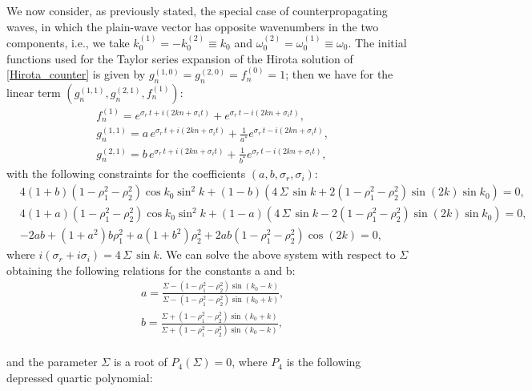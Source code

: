 \documentclass{article}
\begin{document}
We now consider, as previously stated, the special case  of counterpropagating waves, in which the plain-wave vector has opposite wavenumbers in the two components, i.e., we take $k_0^{(1)}=-k_0^{(2)}\equiv k_0$ and $\omega_0^{(2)}=\omega_0^{(1)}\equiv\omega_0$. The initial functions used for the Taylor series expansion of the Hirota solution of \eqref{Hirota_counter} is given by $g^{(1,0)}_n=g^{(2,0)}_n=f^{(0)}_n=1$; then we have for the linear term $(g_n^{(1,1)},g_n^{(2,1)},f^{(1)}_n):$
\begin{equation}
    \begin{split}
       & f^{(1)}_n=e^{\sigma_r\,t+i(2  k n+\sigma_i t)}+e^{\sigma_r\,t-i(2  k n+\sigma_i t)},\\
        & g_n^{(1,1)}=a\,e^{\sigma_r\,t+i(2  k n+\sigma_i t)}+\frac{1}{a^*}e^{\sigma_r\,t-i(2  k n+\sigma_i t)},\\
         & g_n^{(2,1)}=b\,e^{\sigma_r\,t+i(2  k n+\sigma_i t)}+\frac{1}{b^*}e^{\sigma_r\,t-i(2  k n+\sigma_i t)},
    \end{split}
\end{equation}
with the following constraints for the coefficients $(a,b,\sigma_r,\sigma_i)$:
\begin{equation}
\begin{split}
&4(1+b)(1-\rho_1^2-\rho_2^2)\cos k_0\sin^2k+(1-b)(4 \,\Sigma\, \sin k +2(1-\rho_1^2-\rho_2^2)\sin(2 k)\sin k_0)=0,\\[2mm]
&4(1+a)(1-\rho_1^2-\rho_2^2)\cos k_0\sin^2k+(1-a)(4 \,\Sigma\, \sin k-2(1-\rho_1^2-\rho_2^2)\sin(2 k)\sin k_0)=0,\\[2mm]
&-2 ab+(1+a^2)b\rho_1^2+a(1+b^2)\rho_2^2+2ab(1-\rho_1^2-\rho_2^2)\cos(2 k)=0,
\end{split}
\end{equation}
where $i(\sigma_r+i\sigma_i)=4 \,\Sigma\, \sin k $. We can solve the above system with respect to $\Sigma$ obtaining the following relations for the constants a and b:
\begin{equation}
\begin{split}
&a=\frac{\Sigma-(1-\rho_1^2-\rho_2^2)\sin(k_0-k)}{\Sigma-(1-\rho_1^2-\rho_2^2)\sin(k_0+ k)},\\[2mm]
&b=\frac{\Sigma+(1-\rho_1^2-\rho_2^2)\sin(k_0+k)}{\Sigma+(1-\rho_1^2-\rho_2^2)\sin(k_0-k)},
\end{split}
\end{equation}\\
and the parameter $\Sigma$ is a root of $P_4\left(\Sigma\right)=0$, where $P_4$ is the following depressed quartic polynomial:
\end{document}
